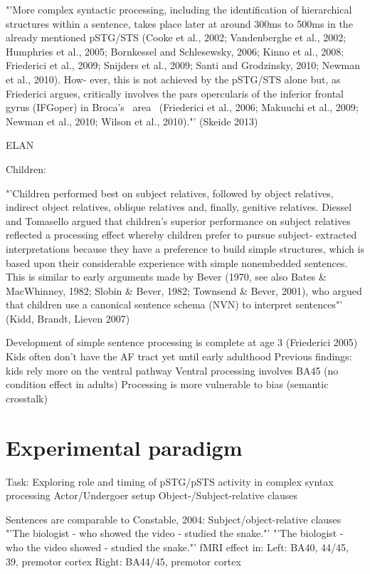  "'More complex syntactic processing, 
 including the identification of hierarchical structures within a sentence, takes 
 place later at around 300ms to 500ms in the already mentioned pSTG/STS 
 (Cooke et al., 2002; Vandenberghe et al., 2002; Humphries et al., 2005; 
 Bornkessel and Schlesewsky, 2006; Kinno et al., 2008; Friederici et al., 2009; 
 Snijders et al., 2009; Santi and Grodzinsky, 2010; Newman et al., 2010). How-
 ever, this is not achieved by the pSTG/STS alone but, as Friederici argues, 
 critically involves the pars opercularis of the inferior frontal gyrus (IFGoper) in 
 Broca's  area  (Friederici et al., 2006; Makuuchi et al., 2009; Newman et al., 
 2010; Wilson et al., 2010)."' (Skeide 2013)

 ELAN

Children:

"'Children
 performed best on subject relatives, followed by object relatives, indirect
 object relatives, oblique relatives and, finally, genitive relatives. Diessel and
 Tomasello argued that children's superior performance on subject relatives
 reflected a processing effect whereby children prefer to pursue subject-
 extracted interpretations because they have a preference to build simple
 structures, which is based upon their considerable experience with simple
 nonembedded sentences. This is similar to early arguments made by Bever
 (1970, see also Bates \& MacWhinney, 1982; Slobin \& Bever, 1982; Townsend
 \& Bever, 2001), who argued that children use a canonical sentence schema
 (NVN) to interpret sentences"' (Kidd, Brandt, Lieven 2007)

Development of simple sentence processing is complete at age 3 (Friederici 2005)
Kids often don't have the AF tract yet until early adulthood
Previous findings: kids rely more on the ventral pathway
Ventral processing involves BA45 (no condition effect in adults)
Processing is more vulnerable to bias (semantic crosstalk)

\section{Experimental paradigm}

Task: Exploring role and timing of pSTG/pSTS activity in complex syntax processing
Actor/Undergoer setup
Object-/Subject-relative clauses

Sentences are comparable to Constable, 2004:
Subject/object-relative clauses
"'The biologist - who showed the video - studied the snake."'
"'The biologist - who the video showed - studied the snake."'
fMRI effect in:
Left: BA40, 44/45, 39, premotor cortex
Right: BA44/45, premotor cortex

